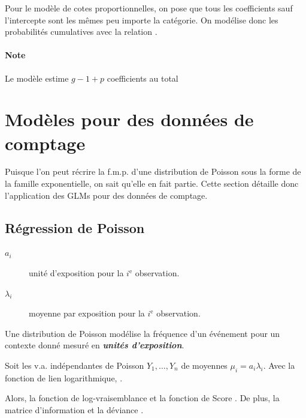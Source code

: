 \documentclass[french]{article}
\begin{document}
\begin{multicols*}{2}
Pour le modèle de cotes proportionnelles, on pose que tous les coefficients sauf l'intercepte sont les mêmes peu importe la catégorie. On modélise donc les probabilités cumulatives avec la relation . 

\paragraph{Note}	Le modèle estime $g - 1 + p$ coefficients au total


\newpage	
\section{Modèles pour des données de comptage}
\begin{rappel_enhanced}[Contexte]
Puisque l'on peut récrire la f.m.p. d'une distribution de Poisson sous la forme de la famille exponentielle, on sait qu'elle en fait partie. Cette section détaille donc l'application des GLMs pour des données de comptage.
\end{rappel_enhanced}

\subsection{Régression de Poisson}
\begin{distributions}[Notation]
\begin{description}
	\item[$a_{i}$]	unité d'exposition pour la $i^{\text{e}}$ observation.
	\item[$\lambda_{i}$]	moyenne par exposition pour la $i^{\text{e}}$ observation.
\end{description}
\end{distributions}
Une distribution de Poisson modélise la fréquence d'un événement pour un contexte donné mesuré en \textbf{\textit{unités d'exposition}}.

Soit les v.a. indépendantes de Poisson $Y_{1}, \dots, Y_{n}$ de moyennes $\mu_{i} = a_{i}\lambda_{i}$. Avec la fonction de lien logarithmique, .

\bigskip

Alors, la fonction de log-vraisemblance  et la fonction de Score . De plus, la matrice d'information  et la déviance .


\end{multicols*}
\end{document}
